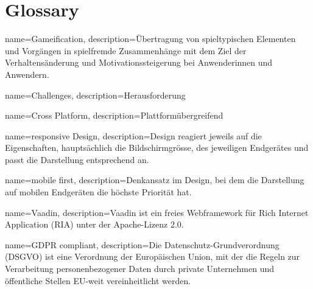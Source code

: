 \chapter{Glossary}

{
    name=Gameification,
    description={\"{U}bertragung von spieltypischen Elementen und Vorg\"{a}ngen in spielfremde Zusammenh\"{a}nge mit dem Ziel der Verhaltens\"{a}nderung und Motivationssteigerung bei Anwenderinnen und Anwendern.}
}


{
    name=Challenges,
    description={Herausforderung}
}


{
    name=Cross Platform,
    description={Plattform\"{u}bergreifend}
}


{
    name=responsive Design,
    description={Design reagiert jeweils auf die Eigenschaften, haupts\"{a}chlich die Bildschirmgr\"{o}sse, des jeweiligen Endger\"{a}tes und passt die Darstellung entsprechend an.}
}


{
    name=mobile first,
    description={Denkansatz im Design, bei dem die Darstellung auf mobilen Endger\"{a}ten die h\"{o}chste Priorit\"{a}t hat.}
}


{
    name=Vaadin,
    description={Vaadin ist ein freies Webframework f\"{u}r Rich Internet Application (RIA) unter der Apache-Lizenz 2.0.}
}


{
    name=GDPR compliant,
    description={Die Datenschutz-Grundverordnung (DSGVO) ist eine Verordnung der Europ\"{a}ischen Union, mit der die Regeln zur Verarbeitung personenbezogener Daten durch private Unternehmen und \"{o}ffentliche Stellen EU-weit vereinheitlicht werden.}
}


\printglossaries
